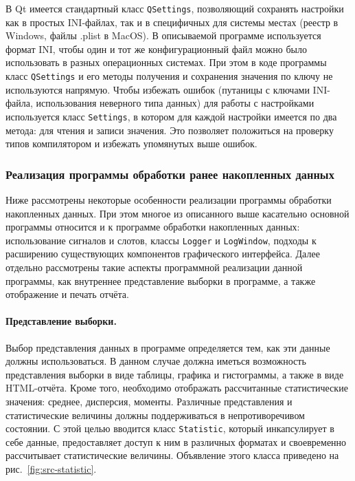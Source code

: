 \documentclass[a4paper, 14pt, titlepage]{extarticle}
\newcommand{\inlinecode}[1]{\lstinline[basicstyle=\ttfamily]{#1}}
\begin{document}
  В Qt имеется стандартный класс \inlinecode{QSettings}, позволяющий сохранять настройки как в
  простых INI-файлах, так и в специфичных для системы местах (реестр в Windows, файлы .plist в
  MacOS). В описываемой программе используется формат INI, чтобы один и тот же конфигурационный
  файл можно было использовать в разных операционных системах. При этом в коде программы класс
  \inlinecode{QSettings} и его методы получения и сохранения значения по ключу не используются
  напрямую. Чтобы избежать ошибок (путаницы с ключами INI-файла, использования неверного типа
  данных) для работы с настройками используется класс \inlinecode{Settings}, в котором для каждой
  настройки имеется по два метода: для чтения и записи значения. Это позволяет положиться на
  проверку типов компилятором и избежать упомянутых выше ошибок.

  \subsubsection{Реализация программы обработки ранее накопленных данных}

  Ниже рассмотрены некоторые особенности реализации программы обработки накопленных данных.
  При этом многое из описанного выше касательно основной программы относится и к программе обработки
  накопленных данных: использование сигналов и слотов, классы \inlinecode{Logger} и
  \inlinecode{LogWindow}, подходы к расширению существующих компонентов графического интерфейса.
  Далее отдельно рассмотрены такие аспекты программной реализации данной программы, как внутреннее
  представление выборки в программе, а также отображение и печать отчёта.

  \paragraph{Представление выборки.}
  Выбор представления данных в программе определяется тем, как эти данные должны использоваться. В
  данном случае должна иметься возможность представления выборки в виде таблицы, графика и
  гистограммы, а также в виде HTML-отчёта. Кроме того, необходимо отображать рассчитанные
  статистические значения: среднее, дисперсия, моменты. Различные представления и статистические
  величины должны поддерживаться в непротиворечивом состоянии. С этой целью вводится класс
  \inlinecode{Statistic}, который инкапсулирует в себе данные, предоставляет доступ к ним в
  различных форматах и своевременно рассчитывает статистические величины. Объявление этого класса
  приведено на рис.~\ref{fig:src-statistic}.
\end{document}

